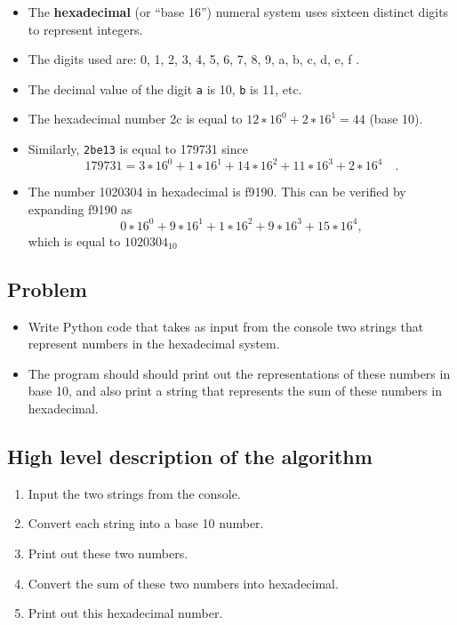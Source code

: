 \documentclass[]{tufte-handout}
\providecommand{\tightlist}{%
  \setlength{\itemsep}{0pt}\setlength{\parskip}{0pt}}
\begin{document}
\begin{itemize}
\tightlist
\item
  The \textbf{hexadecimal} (or ``base 16'') numeral system uses sixteen
  distinct digits to represent integers.
\item
  The digits used are: 0, 1, 2, 3, 4, 5, 6, 7, 8, 9, a, b, c, d, e, f .
\item
  The decimal value of the digit \texttt{a} is 10, \texttt{b} is 11,
  etc.
\item
  The hexadecimal number 2c is equal to \(12 ∗ 16^0 + 2 ∗ 16^1 = 44\)
  (base 10).
\item
  Similarly, \texttt{2be13} is equal to 179731 since \[
  179731 = 3 ∗ 16^0 + 1 ∗ 16^1 + 14 ∗ 16^2 + 11 ∗ 16^3 + 2 ∗ 16^4 \quad.
  \]
\item
  The number 1020304 in hexadecimal is f9190. This can be verified by
  expanding f9190 as \[
  0 ∗ 16^0 + 9 ∗ 16^1 + 1 ∗ 16^2 + 9 ∗ 16^3 + 15 ∗ 16^4 ,
  \] which is equal to \(1020304_{10}\)
\end{itemize}

\subsection{Problem}\label{problem}

\begin{itemize}
\tightlist
\item
  Write Python code that takes as input from the console two strings
  that represent numbers in the hexadecimal system.
\item
  The program should should print out the representations of these
  numbers in base 10, and also print a string that represents the sum of
  these numbers in hexadecimal.
\end{itemize}

\subsection{High level description of the
algorithm}\label{high-level-description-of-the-algorithm}

\begin{enumerate}
\def\labelenumi{\arabic{enumi}.}
\tightlist
\item
  Input the two strings from the console.
\item
  Convert each string into a base 10 number.
\item
  Print out these two numbers.
\item
  Convert the sum of these two numbers into hexadecimal.
\item
  Print out this hexadecimal number.
\end{enumerate}
\end{document}
